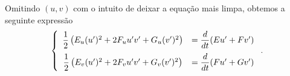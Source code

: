 \documentclass{article}
\begin{document}



Omitindo $(u, v)$ com o intuito de deixar a equação mais limpa, obtemos a seguinte expressão
\begin{equation}
    \label{eq6}
    \left\{\begin{array}{cc}
        \dfrac{1}{2}\left(E_u(u')^2 + 2F_uu'v' + G_u(v')^2\right) & = \dfrac{d}{dt}(Eu' + Fv') \vspace{6pt}\\
        \dfrac{1}{2}\left(E_v(u')^2 + 2F_vu'v' + G_v(v')^2\right) & = \dfrac{d}{dt}(Fu' + Gv')
    \end{array}\right..
\end{equation}
\end{document}
